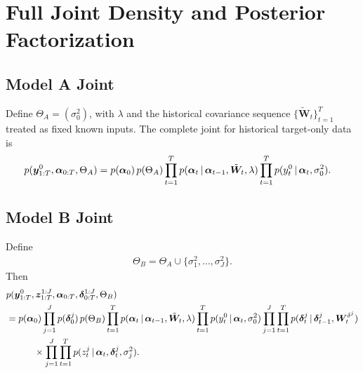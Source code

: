 \section{Full Joint Density and Posterior Factorization}

\subsection{Model A Joint}
Define $\Theta_A=(\sigma_0^2)$, with $\lambda$ and the historical covariance sequence
$\{\tilde{\bm W}_t\}_{t=1}^T$ treated as fixed known inputs.
The complete joint for historical target-only data is
\begin{align}
p(\bm y_{1:T}^0,\bm\alpha_{0:T},\Theta_A)
&= p(\bm\alpha_0)\,p(\Theta_A)
\prod_{t=1}^T p(\bm\alpha_t\,|\,\bm\alpha_{t-1},\tilde{\bm W}_t,\lambda)
\prod_{t=1}^T p(y_t^0\,|\,\bm\alpha_t,\sigma_0^2).\label{eq:joint_A}
\end{align}

\subsection{Model B Joint}
Define
\begin{align}
\Theta_B=\Theta_A\cup\{\sigma_1^2,\dots,\sigma_J^2\}.
\end{align}
Then
\begin{align}
&p(\bm y_{1:T}^0,\bm z_{1:T}^{1:J},\bm\alpha_{0:T},\bm\delta_{0:T}^{1:J},\Theta_B) \\
&= p(\bm\alpha_0)\prod_{j=1}^J p(\bm\delta_0^j)\,p(\Theta_B)
\prod_{t=1}^T p(\bm\alpha_t\,|\,\bm\alpha_{t-1},\tilde{\bm W}_t,\lambda)
\prod_{t=1}^T p(y_t^0\,|\,\bm\alpha_t,\sigma_0^2)
\prod_{j=1}^J\prod_{t=1}^T p(\bm\delta_t^j\,|\,\bm\delta_{t-1}^j,\bm W_t^{\delta^j}) \\
&\hspace{3em}\times
\prod_{j=1}^J\prod_{t=1}^T p(z_t^j\,|\,\bm\alpha_t,\bm\delta_t^j,\sigma_j^2).\label{eq:joint_B}
\end{align}

